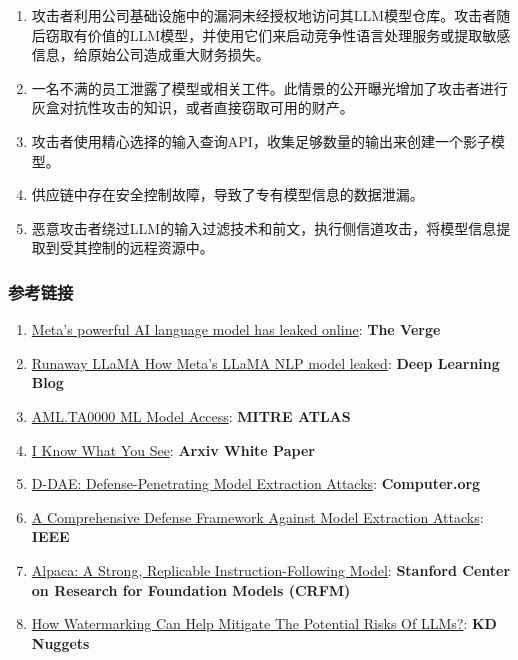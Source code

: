 \documentclass[
]{article}
\providecommand{\tightlist}{%
  \setlength{\itemsep}{0pt}\setlength{\parskip}{0pt}}
\begin{document}
\begin{enumerate}
\def\labelenumi{\arabic{enumi}.}
\tightlist
\item
  攻击者利用公司基础设施中的漏洞未经授权地访问其LLM模型仓库。攻击者随后窃取有价值的LLM模型，并使用它们来启动竞争性语言处理服务或提取敏感信息，给原始公司造成重大财务损失。
\item
  一名不满的员工泄露了模型或相关工件。此情景的公开曝光增加了攻击者进行灰盒对抗性攻击的知识，或者直接窃取可用的财产。
\item
  攻击者使用精心选择的输入查询API，收集足够数量的输出来创建一个影子模型。
\item
  供应链中存在安全控制故障，导致了专有模型信息的数据泄漏。
\item
  恶意攻击者绕过LLM的输入过滤技术和前文，执行侧信道攻击，将模型信息提取到受其控制的远程资源中。
\end{enumerate}

\subsubsection{参考链接}\label{ux53c2ux8003ux94feux63a5}

\begin{enumerate}
\def\labelenumi{\arabic{enumi}.}
\tightlist
\item
  \href{https://www.theverge.com/2023/3/8/23629362/meta-ai-language-model-llama-leak-online-misuse}{Meta's
  powerful AI language model has leaked online}: \textbf{The Verge}
\item
  \href{https://www.deeplearning.ai/the-batch/how-metas-llama-nlp-model-leaked/}{Runaway
  LLaMA \textbar{} How Meta's LLaMA NLP model leaked}: \textbf{Deep
  Learning Blog}
\item
  \href{https://atlas.mitre.org/tactics/AML.TA0000}{AML.TA0000 ML Model
  Access}: \textbf{MITRE ATLAS}
\item
  \href{https://arxiv.org/pdf/1803.05847.pdf}{I Know What You See}:
  \textbf{Arxiv White Paper}
\item
  \href{https://www.computer.org/csdl/proceedings-article/sp/2023/933600a432/1He7YbsiH4c}{D-DAE:
  Defense-Penetrating Model Extraction Attacks}: \textbf{Computer.org}
\item
  \href{https://ieeexplore.ieee.org/document/10080996}{A Comprehensive
  Defense Framework Against Model Extraction Attacks}: \textbf{IEEE}
\item
  \href{https://crfm.stanford.edu/2023/03/13/alpaca.html}{Alpaca: A
  Strong, Replicable Instruction-Following Model}: \textbf{Stanford
  Center on Research for Foundation Models (CRFM)}
\item
  \href{https://www.kdnuggets.com/2023/03/watermarking-help-mitigate-potential-risks-llms.html}{How
  Watermarking Can Help Mitigate The Potential Risks Of LLMs?}:
  \textbf{KD Nuggets}
\end{enumerate}
\end{document}
